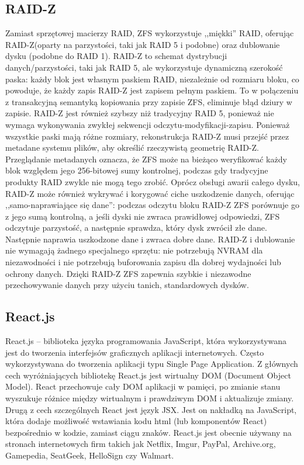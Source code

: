 \documentclass[12pt,a4paper]{article}
\begin{document}
		\subsection{RAID-Z}
			\indent Zamiast sprzętowej macierzy RAID, ZFS wykorzystuje ,,miękki'' RAID, oferując RAID-Z(oparty na parzystości, taki jak RAID 5 i podobne) oraz dublowanie dysku
			(podobne do RAID 1). RAID-Z to schemat dystrybucji danych/parzystości, taki jak RAID 5, ale wykorzystuje dynamiczną szerokość paska: każdy blok jest własnym paskiem
			RAID, niezależnie od rozmiaru
			bloku, co powoduje, że każdy zapis RAID-Z jest zapisem pełnym paskiem. To w połączeniu z transakcyjną semantyką kopiowania przy zapisie ZFS, eliminuje błąd dziury w zapisie.
			RAID-Z jest również szybszy niż tradycyjny RAID 5, ponieważ nie wymaga wykonywania zwykłej sekwencji odczytu-modyfikacji-zapisu. Ponieważ wszystkie paski mają różne rozmiary,
			rekonstrukcja RAID-Z musi przejść przez metadane systemu plików, aby określić rzeczywistą geometrię RAID-Z. Przeglądanie metadanych oznacza, że ZFS może na bieżąco
			weryfikować każdy blok względem jego 256-bitowej sumy kontrolnej, podczas gdy tradycyjne produkty RAID zwykle nie mogą tego zrobić. Oprócz obsługi awarii całego dysku,
			RAID-Z może również wykrywać i korygować ciche uszkodzenie danych, oferując ,,samo-naprawiające się dane'': podczas odczytu bloku RAID-Z ZFS porównuje go z jego sumą kontrolną,
			a jeśli dyski nie zwraca prawidłowej odpowiedzi, ZFS odczytuje parzystość, a następnie sprawdza, który dysk zwrócił złe dane. Następnie naprawia uszkodzone dane i zwraca
			dobre dane. RAID-Z i dublowanie nie wymagają żadnego specjalnego sprzętu: nie potrzebują NVRAM dla niezawodności i nie potrzebują buforowania zapisu dla dobrej wydajności
			lub ochrony danych. Dzięki RAID-Z ZFS zapewnia szybkie i niezawodne przechowywanie danych przy użyciu tanich, standardowych dysków.
		
		\subsection{React.js}
			\indent React.js – biblioteka języka programowania JavaScript, która wykorzystywana jest do tworzenia interfejsów graficznych aplikacji internetowych.
				Często wykorzystywana do tworzenia aplikacji typu Single Page Application. Z głównych cech wyróżniających bibliotekę React.js jest wirtualny DOM
				(Document Object Model). React przechowuje cały DOM aplikacji w pamięci, po zmianie stanu wyszukuje różnice między wirtualnym i prawdziwym DOM
				i aktualizuje zmiany. Drugą z cech szczególnych React jest język JSX. Jest on nakładką na JavaScript, która dodaje możliwość wstawiania kodu html
				(lub komponentów React) bezpośrednio w kodzie, zamiast ciągu znaków. React.js jest obecnie używany na stronach internetowych firm takich
				jak Netflix, Imgur, PayPal, Archive.org, Gamepedia, SeatGeek, HelloSign czy Walmart.
\end{document}
